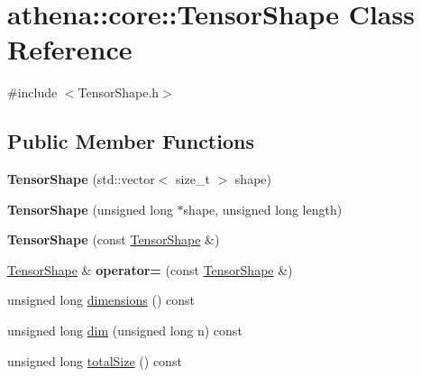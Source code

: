 \hypertarget{classathena_1_1core_1_1_tensor_shape}{}\section{athena\+:\+:core\+:\+:Tensor\+Shape Class Reference}
\label{classathena_1_1core_1_1_tensor_shape}


{\ttfamily \#include $<$Tensor\+Shape.\+h$>$}

\subsection*{Public Member Functions}
\begin{DoxyCompactItemize}
\item 
\mbox{\label{classathena_1_1core_1_1_tensor_shape_ad20d31bd783690b3297831f0269e88a7}} 
{\bfseries Tensor\+Shape} (std\+::vector$<$ size\+\_\+t $>$ shape)
\item 
\mbox{\label{classathena_1_1core_1_1_tensor_shape_afee84a39eb172f5285dbef6fd1e730e2}} 
{\bfseries Tensor\+Shape} (unsigned long $\ast$shape, unsigned long length)
\item 
\mbox{\label{classathena_1_1core_1_1_tensor_shape_a4e64dcd3893bf156602edab7112ccf4e}} 
{\bfseries Tensor\+Shape} (const \mbox{\hyperlink{classathena_1_1core_1_1_tensor_shape}{Tensor\+Shape}} \&)
\item 
\mbox{\label{classathena_1_1core_1_1_tensor_shape_a75503b33e07596367c175d7667d354f5}} 
\mbox{\hyperlink{classathena_1_1core_1_1_tensor_shape}{Tensor\+Shape}} \& {\bfseries operator=} (const \mbox{\hyperlink{classathena_1_1core_1_1_tensor_shape}{Tensor\+Shape}} \&)
\item 
unsigned long \mbox{\hyperlink{classathena_1_1core_1_1_tensor_shape_a73f686650f41bd7fa065aa16dfc4529f}{dimensions}} () const
\item 
unsigned long \mbox{\hyperlink{classathena_1_1core_1_1_tensor_shape_ac0433f4e7a42e5307bb9fb976befdd47}{dim}} (unsigned long n) const
\item 
unsigned long \mbox{\hyperlink{classathena_1_1core_1_1_tensor_shape_a81219fb0b0e3e6852cb02fbbcf059882}{total\+Size}} () const

\end{DoxyCompactItemize}
